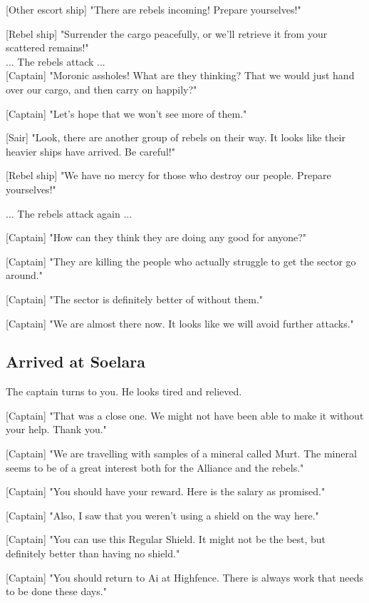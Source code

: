 \documentclass[a4paper,12pt]{article}
\begin{document}
[Other escort ship] "There are rebels incoming! Prepare yourselves!"

[Rebel ship] "Surrender the cargo peacefully, or we'll retrieve it from
your scattered remains!"\\

... The rebels attack ...\\

[Captain] "Moronic assholes! What are they thinking? That we would just hand over our cargo,
and then carry on happily?" 

[Captain] "Let's hope that we won't see more of them."

[Sair] "Look, there are another group of rebels on their way. It looks like
their heavier ships have arrived. Be careful!"

[Rebel ship] "We have no mercy for those who destroy our people. 
Prepare yourselves!"

... The rebels attack again ...

[Captain] "How can they think they are doing any good for anyone?" 

[Captain] "They are killing the people who actually struggle to get the sector go around."

[Captain] "The sector is definitely better of without them."

[Captain] "We are almost there now. It looks like we will avoid further attacks."

\subsection{Arrived at Soelara}

The captain turns to you. He looks tired and relieved. 

[Captain] "That was a close one. We might not have been able to make it without your help. 
Thank you."

[Captain] "We are travelling with samples of a mineral called Murt. The mineral seems to be of a great
interest both for the Alliance and the rebels."

[Captain] "You should have your reward. Here is the salary as promised."
 
[Captain] "Also, I saw that you weren't using a shield on the way here."

[Captain] "You can use this Regular Shield. It might not be the best, 
but definitely better than having no shield."

[Captain] "You should return to Ai at Highfence. There is always work that needs to be done these days."
\end{document}
